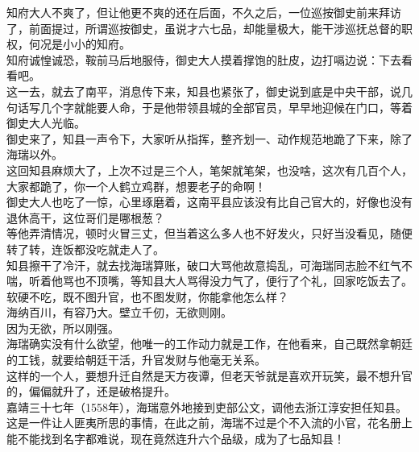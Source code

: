 \begin{multicols}{\theparacolNo}
知府大人不爽了，但让他更不爽的还在后面，不久之后，一位巡按御史前来拜访了，前面提过，所谓巡按御史，虽说才六七品，却能量极大，能干涉巡抚总督的职权，何况是小小的知府。\\

知府诚惶诚恐，鞍前马后地服侍，御史大人摸着撑饱的肚皮，边打嗝边说：下去看看吧。\\

这一去，就去了南平，消息传下来，知县也紧张了，御史说到底是中央干部，说几句话写几个字就能要人命，于是他带领县城的全部官员，早早地迎候在门口，等着御史大人光临。\\

御史来了，知县一声令下，大家听从指挥，整齐划一、动作规范地跪了下来，除了海瑞以外。\\

这回知县麻烦大了，上次不过是三个人，笔架就笔架，也没啥，这次有几百个人，大家都跪了，你一个人鹤立鸡群，想要老子的命啊！\\

御史大人也吃了一惊，心里琢磨着，这南平县应该没有比自己官大的，好像也没有退休高干，这位哥们是哪根葱？\\

等他弄清情况，顿时火冒三丈，但当着这么多人也不好发火，只好当没看见，随便转了转，连饭都没吃就走人了。\\

知县擦干了冷汗，就去找海瑞算账，破口大骂他故意捣乱，可海瑞同志脸不红气不喘，听着他骂也不顶嘴，等知县大人骂得没力气了，便行了个礼，回家吃饭去了。\\

软硬不吃，既不图升官，也不图发财，你能拿他怎么样？\\

海纳百川，有容乃大。壁立千仞，无欲则刚。\\

因为无欲，所以刚强。\\

海瑞确实没有什么欲望，他唯一的工作动力就是工作，在他看来，自己既然拿朝廷的工钱，就要给朝廷干活，升官发财与他毫无关系。\\

这样的一个人，要想升迁自然是天方夜谭，但老天爷就是喜欢开玩笑，最不想升官的，偏偏就升了，还是破格提升。\\

嘉靖三十七年（1558年），海瑞意外地接到吏部公文，调他去浙江淳安担任知县。\\

这是一件让人匪夷所思的事情，在此之前，海瑞不过是个不入流的小官，花名册上能不能找到名字都难说，现在竟然连升六个品级，成为了七品知县！\\


\end{multicols}
